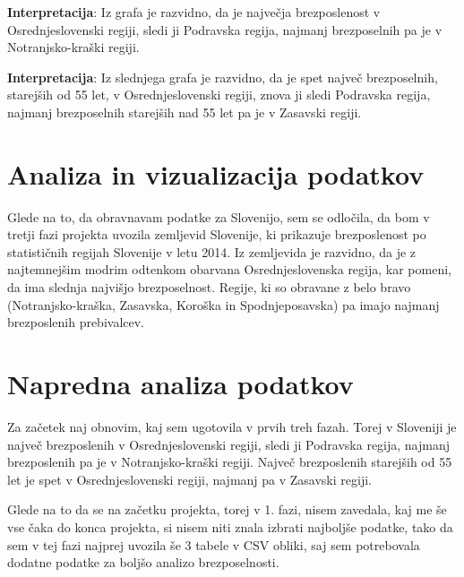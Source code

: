 \documentclass[11pt,a4paper]{article}
\begin{document}
\textbf{Interpretacija}: Iz grafa je razvidno, da je največja brezposlenost v Osrednjeslovenski regiji, sledi ji Podravska regija, najmanj brezposelnih pa je v Notranjsko-kraški regiji.

\textbf{Interpretacija}: Iz slednjega grafa je razvidno, da je spet največ brezposelnih, starejših od 55 let, v Osrednjeslovenski regiji, znova ji sledi Podravska regija, najmanj brezposelnih starejših nad 55 let pa je v Zasavski regiji.

\newpage

\section{Analiza in vizualizacija podatkov}

Glede na to, da obravnavam podatke za Slovenijo, sem se odločila, da bom v tretji fazi projekta uvozila zemljevid Slovenije, ki prikazuje brezposlenost po statističnih regijah Slovenije v letu 2014. Iz zemljevida je razvidno, da je z najtemnejšim modrim odtenkom obarvana Osrednjeslovenska regija, kar pomeni, da ima slednja najvišjo brezposelnost. Regije, ki so obravane z belo bravo (Notranjsko-kraška, Zasavska, Koroška in Spodnjeposavska) pa imajo najmanj brezposlenih prebivalcev.


\newpage

\section{Napredna analiza podatkov}

Za začetek naj obnovim, kaj sem ugotovila v prvih treh fazah. Torej v Sloveniji je največ brezposlenih v Osrednjeslovenski regiji, sledi ji Podravska regija, najmanj brezposlenih pa je v Notranjsko-kraški regiji. Največ brezposlenih starejših od 55 let je spet v Osrednjeslovenski regiji, najmanj pa v Zasavski regiji.


Glede na to da se na začetku projekta, torej v 1. fazi, nisem zavedala, kaj me še vse čaka do konca projekta, si nisem niti znala izbrati najboljše podatke, tako da sem v tej fazi najprej uvozila še 3 tabele v CSV  obliki, saj sem potrebovala dodatne podatke za boljšo analizo brezposelnosti.
\vspace{5mm}
\end{document}
